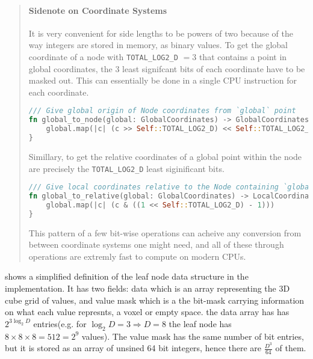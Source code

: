 \begin{quote}
  \paragraph{Sidenote on Coordinate Systems}

  It is very convenient for side lengths to be powers of two because of the way integers are stored in memory, as binary values. To get the global coordinate of a node with \verb|TOTAL_LOG2_D| $= 3$ that contains a point in global coordinates, the 3 least signifcant bits of each coordinate have to be masked out. This can essentially be done in a single CPU instruction for each coordinate.

\begin{lstlisting}[language=rust]
/// Give global origin of Node coordinates from `global` point
fn global_to_node(global: GlobalCoordinates) -> GlobalCoordinates {
    global.map(|c| (c >> Self::TOTAL_LOG2_D) << Self::TOTAL_LOG2_D)
}
\end{lstlisting}

Simillary, to get the relative coordinates of a global point within the node are precisely the \texttt{TOTAL\_LOG2\_D} least siginificant bits.

\begin{lstlisting}[language=rust]
/// Give local coordinates relative to the Node containing `global` position
fn global_to_relative(global: GlobalCoordinates) -> LocalCoordinates {
    global.map(|c| (c & ((1 << Self::TOTAL_LOG2_D) - 1)))
}
\end{lstlisting}

This pattern of a few bit-wise operations can acheive any conversion from between coordinate systems one might need, and all of these through operations are extremly fast to compute on modern CPUs.
\end{quote}

 shows a simplified definition of the leaf node data structure in the implementation. It has two fields: data which is an array representing the 3D cube grid of values, and value mask which is a the bit-mask carrying information on what each value represnts, a voxel or empty space. the data array has has $2^{3\log_{2} D}$ entries(e.g. for $\log_{2} D = 3 \Rightarrow D = 8$ the leaf node has $8\times8\times8 = 512 = 2^{9}$ values). The value mask has the same number of bit entries, but it is stored as an array of unsined 64 bit integers, hence there are $\frac{D^{3}}{64}$ of them.

